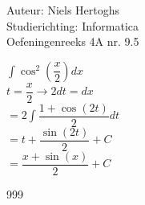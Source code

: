 \documentclass[a4paper]{article}
\begin{document}
	
	\noindent \large Auteur: Niels Hertoghs \\
	\noindent \large Studierichting: Informatica\\
	\noindent \large Oefeningenreeks 4A nr. 9.5\\
	
	\medskip
	
	\normalsize
	
	$\displaystyle\int \cos^2\left(\dfrac{x}{2}\right) dx$\\
	
	$t = \dfrac{x}{2} \rightarrow 2 dt = dx$\\
	
	$= 2 \displaystyle\int \dfrac{1 + \cos(2t)}{2} dt$\\
	
	$= t + \dfrac{\sin(2t)}{2} + C$\\
	
	$= \dfrac{x + \sin(x)}{2} + C$\\
	
	
	\begin{thebibliography}{999}
	\end{thebibliography}
	
\end{document}
